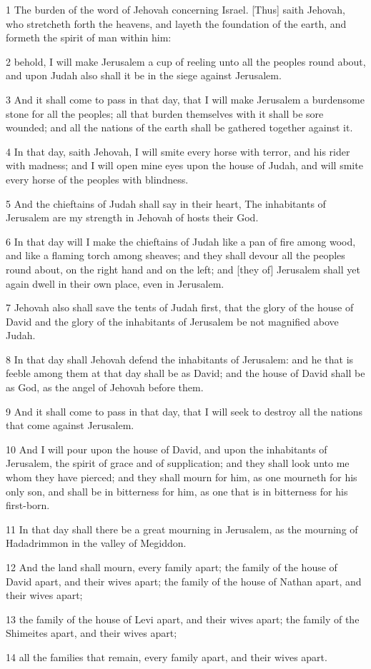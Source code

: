 \par 1 The burden of the word of Jehovah concerning Israel. [Thus] saith Jehovah, who stretcheth forth the heavens, and layeth the foundation of the earth, and formeth the spirit of man within him:
\par 2 behold, I will make Jerusalem a cup of reeling unto all the peoples round about, and upon Judah also shall it be in the siege against Jerusalem.
\par 3 And it shall come to pass in that day, that I will make Jerusalem a burdensome stone for all the peoples; all that burden themselves with it shall be sore wounded; and all the nations of the earth shall be gathered together against it.
\par 4 In that day, saith Jehovah, I will smite every horse with terror, and his rider with madness; and I will open mine eyes upon the house of Judah, and will smite every horse of the peoples with blindness.
\par 5 And the chieftains of Judah shall say in their heart, The inhabitants of Jerusalem are my strength in Jehovah of hosts their God.
\par 6 In that day will I make the chieftains of Judah like a pan of fire among wood, and like a flaming torch among sheaves; and they shall devour all the peoples round about, on the right hand and on the left; and [they of] Jerusalem shall yet again dwell in their own place, even in Jerusalem.
\par 7 Jehovah also shall save the tents of Judah first, that the glory of the house of David and the glory of the inhabitants of Jerusalem be not magnified above Judah.
\par 8 In that day shall Jehovah defend the inhabitants of Jerusalem: and he that is feeble among them at that day shall be as David; and the house of David shall be as God, as the angel of Jehovah before them.
\par 9 And it shall come to pass in that day, that I will seek to destroy all the nations that come against Jerusalem.
\par 10 And I will pour upon the house of David, and upon the inhabitants of Jerusalem, the spirit of grace and of supplication; and they shall look unto me whom they have pierced; and they shall mourn for him, as one mourneth for his only son, and shall be in bitterness for him, as one that is in bitterness for his first-born.
\par 11 In that day shall there be a great mourning in Jerusalem, as the mourning of Hadadrimmon in the valley of Megiddon.
\par 12 And the land shall mourn, every family apart; the family of the house of David apart, and their wives apart; the family of the house of Nathan apart, and their wives apart;
\par 13 the family of the house of Levi apart, and their wives apart; the family of the Shimeites apart, and their wives apart;
\par 14 all the families that remain, every family apart, and their wives apart.

